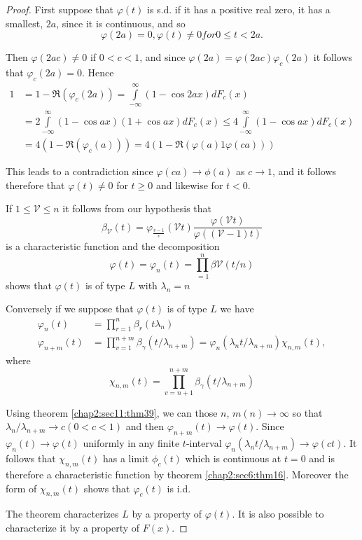 \begin{proof}
First suppose that $\varphi (t)$ is s.d. if it has a positive real
zero, it has a smallest, $2a$, since it is continuous, and so  
 $$
\varphi (2a)=0, \varphi(t)\neq 0 for 0 \le t  <  2a.
 $$

Then $\varphi (2a c) \neq 0$ if $0<c<1$, and since
$\varphi(2a)=\varphi(2a c) \varphi_c (2a)$ it follows that
$\varphi_c(2a)=0$. Hence 
\begin{align*}
  1&=1-\mathfrak{R}(\varphi_c(2a)) =
  \int\limits^\infty_{-\infty}(1-\cos 2 ax) d F_c(x)\\ 
  &=2 \int\limits^\infty_{-\infty}(1-\cos a x) (1+ \cos ax) d F_c(x)\le 4
  \int\limits^{\infty}_{-\infty}(1 - \cos a x) d F_c(x) \\
  & =4(1-\mathfrak{R}(\varphi_c(a)))=4(1-\mathfrak{R}(\varphi(a)1\varphi(c a)))
\end{align*}

 This leads to a contradiction since $\varphi(ca)\rightarrow \phi(a)$ as $c
 \rightarrow 1$, and it follows therefore that $\varphi(t)\neq 0$ for $t
 \ge 0$ and likewise for $t<0$. 
 
 If $1\le \mathcal{V}\le n$ it follows from our hypothesis that 
 $$
 \beta_\mathcal{V}(t)=\varphi
 _\frac{v-1}{v}(\mathcal{V}t)
 \frac{\varphi(\mathcal{V}t)}{\varphi((\mathcal{V}-1)t)}  
$$ 
is a characteristic function and the decomposition
 $$
 \varphi
 (t)=\varphi_n(t)=\displaystyle\prod^{n}_{=1}\beta\mathcal{V}(t/n) 
 $$ 
 shows that $\varphi (t)$ is of type $L$ with $\lambda_n =n$
 
 Conversely if we suppose that $\varphi (t)$ is of type $L$ we have 
 \begin{align*}
 \varphi_n (t)& =\displaystyle\prod^{n}_{r=1}\beta_r(t \lambda_n)\\ 
 \varphi_{n+m}(t)& =\displaystyle\prod^{n+m}_{v=1}\beta_\gamma(t/
 \lambda_{n+m})=\varphi_n(\lambda_n t/ \lambda_{n+m})\chi_{n,m}(t), 
 \end{align*}
 where\pageoriginale 
 $$
 \chi_{n,m}(t)=\displaystyle\prod^{n+m}_{v=n+1}\beta_\gamma(t/
 \lambda_{n+m})
 $$
 
 Using theorem \ref{chap2:sec11:thm39}, we can those $n$, $m(n) \rightarrow \infty$ so that
 $\lambda_n/ \lambda_{n+m}\rightarrow c (0 <c<1)$ and then
 $\varphi_{n+m}(t)\rightarrow\varphi (t)$.  Since
 $\varphi_n(t)\rightarrow\varphi(t)$ uniformly in any finite
 $t$-interval $\varphi_n(\lambda_n t/ \lambda_{n+m})\rightarrow \varphi
 (ct)$. It follows that $\chi_{n,m}(t)$ has a limit
 $\phi_c (t)$ which is continuous at $t=0$ and is therefore a
 characteristic function by theorem \ref{chap2:sec6:thm16}. Moreover the form of
 $\chi_{n,m} (t)$ shows that $\varphi_c (t)$ is i.d. 
 
 The theorem characterizes $L$ by a property of $\varphi (t)$. It is also
 possible to characterize it by a property of $F(x)$. 
\end{proof}

